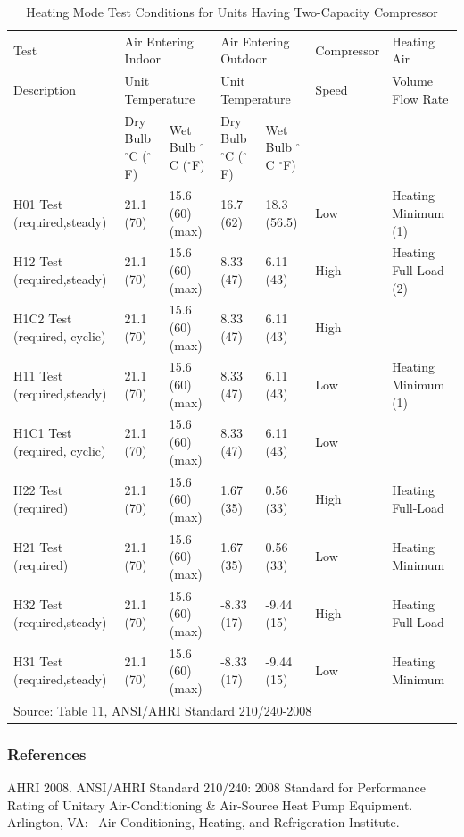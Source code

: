 \begin{longtable}[c]{p{1.2in}p{0.7in}p{0.7in}p{0.7in}p{0.7in}p{0.85in}p{1.0in}}
\caption{Heating Mode Test Conditions for Units Having Two-Capacity Compressor \label{table:heating-mode-test-conditions-for-units-having-001}} \tabularnewline
\toprule 
Test & \multicolumn{2}{l}{Air Entering Indoor} & \multicolumn{2}{l}{Air Entering Outdoor} & Compressor & Heating Air \tabularnewline
Description & \multicolumn{2}{l}{Unit Temperature} & \multicolumn{2}{l}{Unit Temperature} & Speed & Volume Flow Rate \tabularnewline
\midrule
& Dry Bulb \(^{\circ}\)C (\(^{\circ}\)F) & Wet Bulb \(^{\circ}\)C (\(^{\circ}\)F) & Dry Bulb \(^{\circ}\)C (\(^{\circ}\)F) & Wet Bulb \(^{\circ}\)C \(^{\circ}\)F) \tabularnewline

H01 Test  (required,steady)  & 21.1 (70) & 15.6 (60) (max) & 16.7 (62)  & 18.3 (56.5) & Low  & Heating Minimum (1)   \tabularnewline
H12 Test  (required,steady)  & 21.1 (70) & 15.6 (60) (max) & 8.33 (47)  & 6.11 (43)   & High & Heating Full-Load (2) \tabularnewline
H1C2 Test (required, cyclic) & 21.1 (70) & 15.6 (60) (max) & 8.33 (47)  & 6.11 (43)   & High &                       \tabularnewline
H11 Test  (required,steady)  & 21.1 (70) & 15.6 (60) (max) & 8.33 (47)  & 6.11 (43)   & Low  & Heating Minimum (1)   \tabularnewline
H1C1 Test (required, cyclic) & 21.1 (70) & 15.6 (60) (max) & 8.33 (47)  & 6.11 (43)   & Low  &                       \tabularnewline
H22 Test  (required)         & 21.1 (70) & 15.6 (60) (max) & 1.67 (35)  & 0.56 (33)   & High & Heating Full-Load     \tabularnewline
H21 Test  (required)         & 21.1 (70) & 15.6 (60) (max) & 1.67 (35)  & 0.56 (33)   & Low  & Heating Minimum       \tabularnewline
H32 Test  (required,steady)  & 21.1 (70) & 15.6 (60) (max) & -8.33 (17) & -9.44 (15)  & High & Heating Full-Load     \tabularnewline
H31 Test  (required,steady)  & 21.1 (70) & 15.6 (60) (max) & -8.33 (17) & -9.44 (15)  & Low  & Heating Minimum       \tabularnewline
\midrule
\multicolumn{7}{l}{Source: Table 11, ANSI/AHRI Standard 210/240-2008}

\end{longtable}

\subsubsection{References}\label{references-6-000}

AHRI 2008. ANSI/AHRI Standard 210/240: 2008 Standard for Performance Rating of Unitary Air-Conditioning \& Air-Source Heat Pump Equipment.~ Arlington, VA:~ Air-Conditioning, Heating, and Refrigeration Institute.

